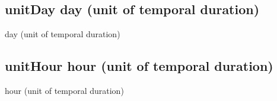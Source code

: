 \documentclass[letterpaper,10pt,english]{sphinxmanual}
\begin{document}
\subsection{unitDay \sphinxhyphen{} day (unit of temporal duration)}
\label{\detokenize{doc-unitDay:unitday-day-unit-of-temporal-duration}}\label{\detokenize{doc-unitDay:index-0}}\label{\detokenize{doc-unitDay::doc}}
\begin{sphinxShadowBox}

\sphinxAtStartPar
day (unit of temporal duration)
\end{sphinxShadowBox}

\begin{sphinxShadowBox}

\sphinxAtStartPar
{}
\end{sphinxShadowBox}
\begin{quote}

\ignorespaces \end{quote}


\subsection{unitHour \sphinxhyphen{} hour (unit of temporal duration)}
\label{\detokenize{doc-unitHour:unithour-hour-unit-of-temporal-duration}}\label{\detokenize{doc-unitHour:index-0}}\label{\detokenize{doc-unitHour::doc}}
\begin{sphinxShadowBox}

\sphinxAtStartPar
hour (unit of temporal duration)
\end{sphinxShadowBox}

\begin{sphinxShadowBox}

\sphinxAtStartPar
{}
\end{sphinxShadowBox}
\begin{quote}

\ignorespaces \end{quote}
\end{document}
